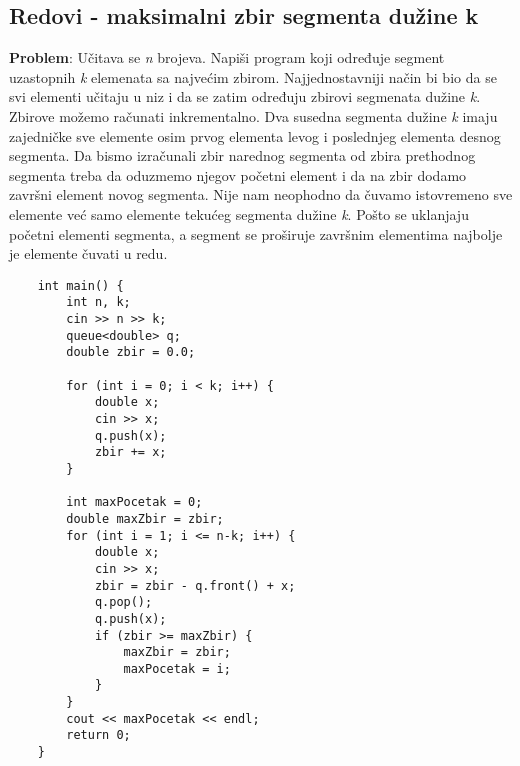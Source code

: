 \documentclass{article}
\begin{document}
\subsection{Redovi - maksimalni zbir segmenta dužine k}
\textbf{Problem}: Učitava se \textit{n} brojeva. Napiši program koji određuje segment uzastopnih \textit{k} elemenata sa najvećim zbirom.
\newline
Najjednostavniji način bi bio da se svi elementi učitaju u niz i da se zatim
određuju zbirovi segmenata dužine \textit{k}. 
\newline Zbirove možemo računati inkrementalno. Dva susedna segmenta dužine \textit{k} imaju zajedničke sve elemente
osim prvog elementa levog i poslednjeg elementa desnog segmenta. Da bismo izračunali zbir narednog segmenta od zbira prethodnog segmenta treba da oduzmemo njegov početni element i da na zbir dodamo završni element novog segmenta. Nije nam neophodno da čuvamo istovremeno sve elemente već samo elemente tekućeg segmenta dužine \textit{k}. Pošto se
uklanjaju početni elementi segmenta, a segment se proširuje završnim elementima najbolje je elemente čuvati u redu.
\begin{lstlisting}
    int main() {
        int n, k;
        cin >> n >> k;
        queue<double> q;
        double zbir = 0.0;
        
        for (int i = 0; i < k; i++) {
            double x; 
            cin >> x;
            q.push(x);
            zbir += x;
        }

        int maxPocetak = 0;
        double maxZbir = zbir;
        for (int i = 1; i <= n-k; i++) {
            double x; 
            cin >> x;
            zbir = zbir - q.front() + x;
            q.pop();
            q.push(x);
            if (zbir >= maxZbir) {
                maxZbir = zbir;
                maxPocetak = i;
            }
        }
        cout << maxPocetak << endl;
        return 0;
    }
\end{lstlisting}
\end{document}

